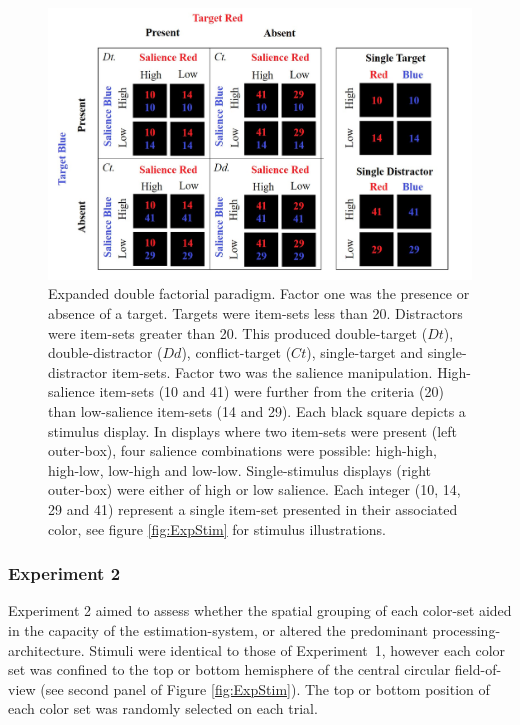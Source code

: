 \begin{figure}[htb]
\centering \includegraphics[width = \linewidth]{Figures/EstSystems/FIG5JPG.jpg}
\caption{Expanded double factorial paradigm. Factor one was the presence or absence of a target. Targets were item-sets less than 20. Distractors were item-sets greater than 20. This produced double-target ($Dt$), double-distractor ($Dd$), conflict-target ($Ct$), single-target and single-distractor item-sets. Factor two was the salience manipulation. High-salience item-sets (10 and 41) were further from the criteria (20) than low-salience item-sets (14 and 29). Each black square depicts a stimulus display. In displays where two item-sets were present (left outer-box), four salience combinations were possible: high-high, high-low, low-high and low-low. Single-stimulus displays (right outer-box) were either of high or low salience. Each integer (10, 14, 29 and 41) represent a single item-set presented in their associated color, see figure \ref{fig:ExpStim} for stimulus illustrations.}
\label{fig:DFP}
\end{figure}

\subsubsection{Experiment 2}
Experiment 2 aimed to assess whether the spatial grouping of each color-set aided in the capacity of the estimation-system, or altered the predominant processing-architecture. Stimuli were identical to those of Experiment~1, however each color set was confined to the top or bottom hemisphere of the central circular field-of-view (see second panel of Figure \ref{fig:ExpStim}). The top or bottom position of each color set was randomly selected on each trial. 

